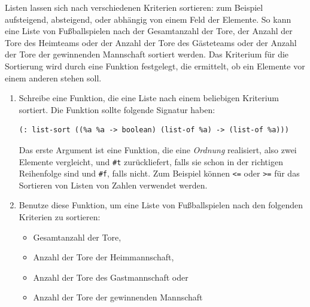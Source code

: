 \begin{aufgabe}
  Listen lassen sich nach verschiedenen Kriterien
  sortieren: zum Beispiel aufsteigend, absteigend, oder abhängig von
  einem Feld der Elemente.  So kann eine Liste von Fußballspielen nach
  der Gesamtanzahl der Tore, der Anzahl der Tore des Heimteams oder
  der Anzahl der Tore des Gästeteams oder der Anzahl der Tore der
  gewinnenden Mannschaft sortiert werden.  Das Kriterium für die
  Sortierung wird durch
  eine Funktion festgelegt, die ermittelt, ob ein Elemente vor einem anderen
  stehen soll.

\begin{enumerate}
\item Schreibe eine Funktion, die eine Liste nach einem beliebigen
  Kriterium sortiert.  Die Funktion sollte folgende Signatur haben:

\begin{lstlisting}
(: list-sort ((%a %a -> boolean) (list-of %a) -> (list-of %a)))
\end{lstlisting}

  Das erste Argument ist eine Funktion, die eine \textit{Ordnung}
  realisiert, also zwei Elemente vergleicht, und \lstinline{#t}
  zurückliefert, falls sie schon in der richtigen Reihenfolge sind und
  \lstinline{#f}, falls nicht.  Zum Beispiel können \lstinline{<=} oder \lstinline{>=}
  für das Sortieren von Listen von Zahlen verwendet werden.
\item Benutze diese Funktion, um eine Liste von
  Fußballspielen nach den folgenden Kriterien zu sortieren:
  \begin{itemize}
  \item Gesamtanzahl der Tore,
  \item Anzahl der Tore der Heimmannschaft,
  \item Anzahl der Tore des Gastmannschaft oder
  \item Anzahl der Tore der
    gewinnenden Mannschaft
  \end{itemize}
\end{enumerate}
\end{aufgabe}

